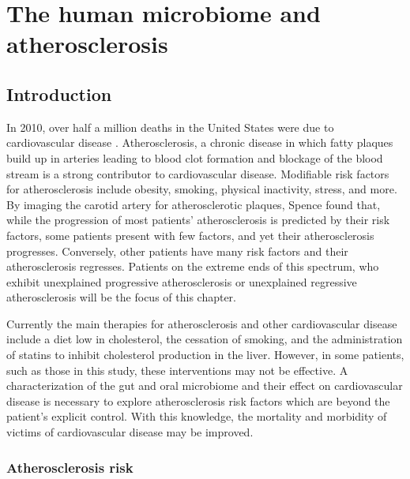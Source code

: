 \chapter{The human microbiome and atherosclerosis}
\section{Introduction}
In 2010, over half a million deaths in the United States were due to cardiovascular disease \cite{murphy2012deaths}. Atherosclerosis, a chronic disease in which fatty plaques build up in arteries leading to blood clot formation and blockage of the blood stream is a strong contributor to cardiovascular disease. Modifiable risk factors for atherosclerosis include obesity, smoking, physical inactivity, stress, and more. By imaging the carotid artery for atherosclerotic plaques, Spence \cite{spence2012genetics} found that, while the progression of most patients’ atherosclerosis is predicted by their risk factors, some patients present with few factors, and yet their atherosclerosis progresses. Conversely, other patients have many risk factors and their atherosclerosis regresses. Patients on the extreme ends of this spectrum, who exhibit unexplained progressive atherosclerosis or unexplained regressive atherosclerosis will be the focus of this chapter.

Currently the main therapies for atherosclerosis and other cardiovascular disease include a diet low in cholesterol, the cessation of smoking, and the administration of statins to inhibit cholesterol production in the liver. However, in some patients, such as those in this study, these interventions may not be effective. A characterization of the gut and oral microbiome and their effect on cardiovascular disease is necessary to explore atherosclerosis risk factors which are beyond the patient’s explicit control. With this knowledge, the mortality and morbidity of victims of cardiovascular disease may be improved.

\subsection{Atherosclerosis risk}

